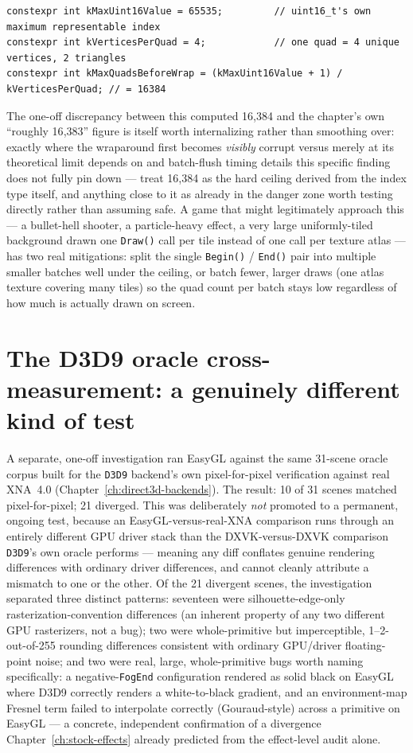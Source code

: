 \begin{lstlisting}
constexpr int kMaxUint16Value = 65535;         // uint16_t's own maximum representable index
constexpr int kVerticesPerQuad = 4;            // one quad = 4 unique vertices, 2 triangles
constexpr int kMaxQuadsBeforeWrap = (kMaxUint16Value + 1) / kVerticesPerQuad; // = 16384
\end{lstlisting}

The one-off discrepancy between this computed 16{,}384 and the chapter's own ``roughly
16{,}383'' figure is itself worth internalizing rather than smoothing over: exactly where the
wraparound first becomes \emph{visibly} corrupt versus merely at its theoretical limit depends
on  and batch-flush timing details this specific finding does not
fully pin down --- treat 16{,}384 as the hard ceiling derived from the index type itself, and
anything close to it as already in the danger zone worth testing directly rather than assuming
safe. A game that might legitimately approach this --- a bullet-hell shooter, a particle-heavy
effect, a very large uniformly-tiled background drawn one \texttt{Draw()} call per tile
instead of one call per texture atlas --- has two real mitigations: split the single
 \texttt{Begin()} / \texttt{End()} pair into multiple smaller batches well
under the ceiling, or batch fewer, larger draws (one atlas texture covering many tiles) so the
quad count per batch stays low regardless of how much is actually drawn on screen.

\section{The D3D9 oracle cross-measurement: a genuinely different kind of test}

A separate, one-off investigation ran EasyGL against the same 31-scene oracle corpus built
for the \texttt{D3D9} backend's own pixel-for-pixel verification against real XNA~4.0
(Chapter~\ref{ch:direct3d-backends}). The result: 10 of 31 scenes matched pixel-for-pixel;
21 diverged. This was deliberately \emph{not} promoted to a permanent, ongoing test, because
an EasyGL-versus-real-XNA comparison runs through an entirely different GPU driver stack than
the DXVK-versus-DXVK comparison \texttt{D3D9}'s own oracle performs --- meaning any diff
conflates genuine rendering differences with ordinary driver differences, and cannot cleanly
attribute a mismatch to one or the other. Of the 21 divergent scenes, the investigation
separated three distinct patterns: seventeen were silhouette-edge-only rasterization-convention
differences (an inherent property of any two different GPU rasterizers, not a bug);
two were whole-primitive but imperceptible, 1--2-out-of-255 rounding differences consistent
with ordinary GPU/driver floating-point noise; and two were real, large, whole-primitive
bugs worth naming specifically: a negative-\texttt{FogEnd} configuration rendered as solid
black on EasyGL where D3D9 correctly renders a white-to-black gradient, and an
environment-map Fresnel term failed to interpolate correctly (Gouraud-style) across a
primitive on EasyGL --- a concrete, independent confirmation of a divergence
Chapter~\ref{ch:stock-effects} already predicted from the effect-level audit alone.

